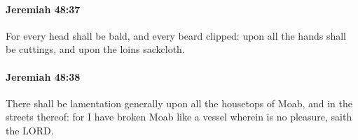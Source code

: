 		\paragraph{Jeremiah 48:37} %
			\label{JEREMIAH-48-37}

			For every head shall be bald, and every beard clipped: upon all the hands shall be cuttings, and upon the loins sackcloth.


		\paragraph{Jeremiah 48:38} %
			\label{JEREMIAH-48-38}

			There shall be lamentation generally upon all the housetops of Moab, and in the streets thereof: for I have broken Moab like a vessel wherein is no pleasure, saith the LORD.


